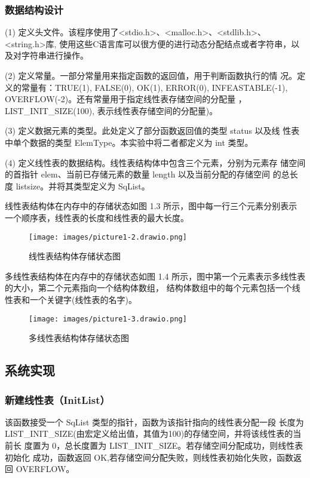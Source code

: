 \documentclass[supercite]{Experimental_Report}
\theoremstyle{definition}
\begin{document}
\subsubsection{数据结构设计}
(1) 定义头文件。该程序使用了<stdio.h>、<malloc.h>、<stdlib.h>、<string.h>库,
使用这些C语言库可以很方便的进行动态分配结点或者字符串，以及对字符串进行操作。

(2) 定义常量。一部分常量用来指定函数的返回值，用于判断函数执行的情
况。定义的常量有：TRUE(1), FALSE(0), OK(1), ERROR(0), INFEASTABLE(-1),
OVERFLOW(-2)。还有常量用于指定线性表存储空间的分配量 ，
LIST\_INIT\_SIZE(100), 表示线性表存储空间的分配量)。

(3) 定义数据元素的类型。此处定义了部分函数返回值的类型 status 以及线
性表中单个数据的类型 ElemType。本实验中将二者都定义为 int 类型。

(4) 定义线性表的数据结构。线性表结构体中包含三个元素，分别为元素存
储空间的首指针 elem、当前已存储元素的数量 length 以及当前分配的存储空间
的总长度 listsize。并将其类型定义为 SqList。

线性表结构体在内存中的存储状态如图 1.3 所示，图中每一行三个元素分别表示
一个顺序表，线性表的长度和线性表的最大长度。

\begin{figure}[H]
	\begin{center}
		\texttt{[image: images/picture1-2.drawio.png]}
		\vspace{0.6cm}
		\caption{线性表结构体存储状态图}
		\label{fig1-3}
	\end{center}
\end{figure}

多线性表结构体在内存中的存储状态如图 1.4 所示，图中第一个元素表示多线性表的大小，第二个元素指向一个结构体数组，
结构体数组中的每个元素包括一个线性表和一个关键字(线性表的名字)。

\begin{figure}[H]
	\begin{center}
		\texttt{[image: images/picture1-3.drawio.png]}
		\vspace{0.6cm}
		\caption{多线性表结构体存储状态图}
		\label{fig1-3}
	\end{center}
\end{figure}

\subsection{系统实现}
\subsubsection{新建线性表（InitList）}
该函数接受一个 SqList 类型的指针，函数为该指针指向的线性表分配一段
长度为 LIST\_INIT\_SIZE(由宏定义给出值，其值为100)的存储空间，并将该线性表的当前长
度置为 0，总长度置为 LIST\_INIT\_SIZE。若存储空间分配成功，则线性表初始化
成功，函数返回 OK,若存储空间分配失败，则线性表初始化失败，函数返回
OVERFLOW。
\end{document}
